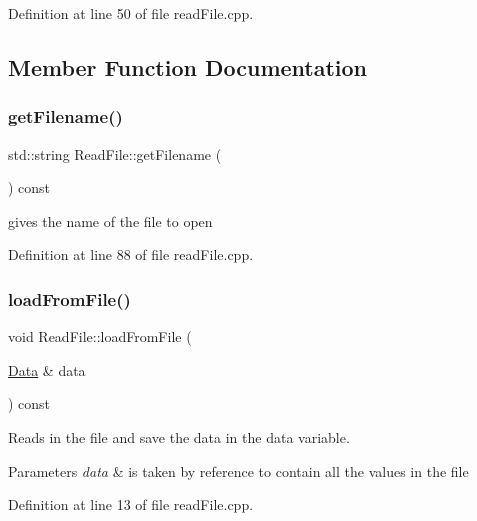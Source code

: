Definition at line 50 of file read\+File.\+cpp.



\subsection{Member Function Documentation}
\mbox{\label{class_read_file_a494ba4e13b3619ff95bb0889f77b95aa}} 
\subsubsection{\texorpdfstring{get\+Filename()}{getFilename()}}
{\footnotesize\ttfamily std\+::string Read\+File\+::get\+Filename (\begin{DoxyParamCaption}{ }\end{DoxyParamCaption}) const}



gives the name of the file to open 



Definition at line 88 of file read\+File.\+cpp.

\mbox{\label{class_read_file_ad801fc147cb2522536db3da40735724b}} 
\subsubsection{\texorpdfstring{load\+From\+File()}{loadFromFile()}}
{\footnotesize\ttfamily void Read\+File\+::load\+From\+File (\begin{DoxyParamCaption}\item[{\mbox{\hyperlink{struct_data}{Data}} \&}]{data }\end{DoxyParamCaption}) const}



Reads in the file and save the data in the data variable. 


\begin{DoxyParams}{Parameters}
{\em data} & is taken by reference to contain all the values in the file \\
\hline
\end{DoxyParams}


Definition at line 13 of file read\+File.\+cpp.

